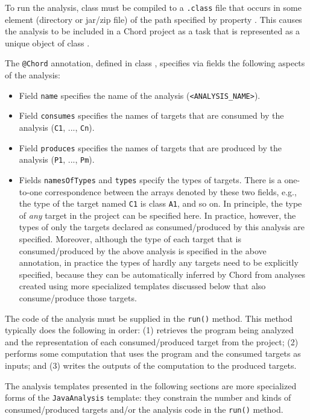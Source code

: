 To run the analysis, class  must be compiled to
a {\tt .class} file that occurs in some element (directory or jar/zip file) of the path
specified by property .
This causes the analysis to be included in a Chord project as a task
that is represented as a unique object of class .

The {\tt @Chord} annotation, defined in
class , specifies
via fields the following aspects of the analysis:
\begin{itemize}
\item
Field {\tt name} specifies the name of the analysis ({\tt <ANALYSIS_NAME>}).
\item
Field {\tt consumes} specifies the names of targets that are consumed by the analysis ({\tt C1}, ..., {\tt Cn}).
\item
Field {\tt produces} specifies the names of targets that are produced by the analysis ({\tt P1}, ..., {\tt Pm}).
\item
Fields {\tt namesOfTypes} and {\tt types} specify the types of targets.
There is a one-to-one correspondence between the arrays denoted by these two fields,
e.g., the type of the target named {\tt C1} is
class {\tt A1}, and so on.  In principle, the type of {\it any} target in the
project can be specified here.  In practice, however, the types of only the
targets declared as consumed/produced by this analysis are specified.
Moreover, although the type of each target that is consumed/produced by
the above analysis is specified in the above annotation, in practice the types
of hardly any targets need to be explicitly specified, because they can be
automatically inferred by Chord from analyses created using more specialized
templates discussed below that also consume/produce those targets.
\end{itemize}

The code of the analysis must be supplied in the {\tt run()} method.  This
method typically does the following in order:
(1) retrieves the program being analyzed and the representation of each consumed/produced target from the project;
(2) performs some computation that uses the program and the consumed targets as inputs; and
(3) writes the outputs of the computation to the produced targets.

The analysis templates presented in the following sections are more specialized
forms of the {\tt JavaAnalysis} template: they constrain
the number and kinds of consumed/produced targets and/or
the analysis code in the {\tt run()} method.

